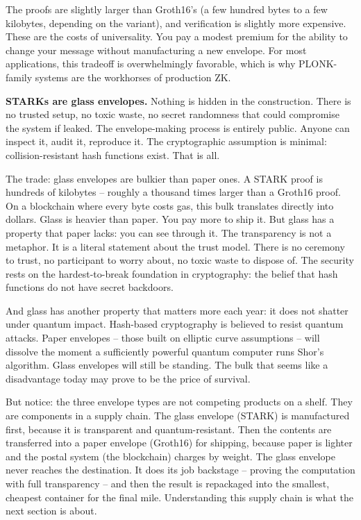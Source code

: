 \documentclass[
  11pt,
  openany]{report}
\renewcommand{\textbf}[1]{{\bfseries\color{MidnightBold}#1}}
\begin{document}
The proofs are slightly larger than Groth16's (a few hundred bytes to a few
kilobytes, depending on the variant), and verification is slightly more
expensive. These are the costs of universality. You pay a modest premium for the
ability to change your message without manufacturing a new envelope. For most
applications, this tradeoff is overwhelmingly favorable, which is why
PLONK-family systems are the workhorses of production ZK.

\textbf{STARKs are glass envelopes.} Nothing is hidden in the construction.
There is no trusted setup, no toxic waste, no secret randomness that could
compromise the system if leaked. The envelope-making process is entirely public.
Anyone can inspect it, audit it, reproduce it. The cryptographic assumption is
minimal: collision-resistant hash functions exist. That is all.

The trade: glass envelopes are bulkier than paper ones. A STARK proof is
hundreds of kilobytes -- roughly a thousand times larger than a Groth16 proof.
On a blockchain where every byte costs gas, this bulk translates directly into
dollars. Glass is heavier than paper. You pay more to ship it. But glass has a
property that paper lacks: you can see through it. The transparency is not a
metaphor. It is a literal statement about the trust model. There is no ceremony
to trust, no participant to worry about, no toxic waste to dispose of. The
security rests on the hardest-to-break foundation in cryptography: the belief
that hash functions do not have secret backdoors.

And glass has another property that matters more each year: it does not shatter
under quantum impact. Hash-based cryptography is believed to resist quantum
attacks. Paper envelopes -- those built on elliptic curve assumptions -- will
dissolve the moment a sufficiently powerful quantum computer runs Shor's
algorithm. Glass envelopes will still be standing. The bulk that seems like a
disadvantage today may prove to be the price of survival.

But notice: the three envelope types are not competing products on a shelf. They
are components in a supply chain. The glass envelope (STARK) is manufactured
first, because it is transparent and quantum-resistant. Then the contents are
transferred into a paper envelope (Groth16) for shipping, because paper is
lighter and the postal system (the blockchain) charges by weight. The glass
envelope never reaches the destination. It does its job backstage -- proving the
computation with full transparency -- and then the result is repackaged into the
smallest, cheapest container for the final mile. Understanding this supply chain
is what the next section is about.
\end{document}
